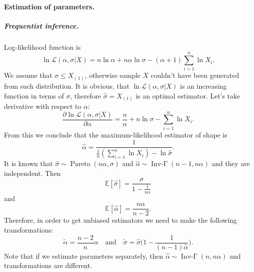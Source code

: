 \documentclass[a4paper,11pt]{article}
\theoremstyle{plain}
\theoremstyle{definition}
\begin{document}
\paragraph{Estimation of parameters.}
\subparagraph{Frequentist inference.} Log-likelihood function is
\[
\ln \mathcal{L}(\alpha, \sigma | X) = n \ln \alpha + n \alpha \ln \sigma - (\alpha + 1) \sum_{i=1}^{n} \ln X_i.
\]
We assume that $\sigma \leq X_{(1)}$, otherwise sample $X$ couldn't have been generated from such distribution. It is obvious, that $\ln \mathcal{L}(\alpha, \sigma | X)$ is an increasing function in terms of $\sigma$, therefore $\hat{\sigma} = X_{(1)}$ is an optimal estimator.
Let's take derivative with respect to $\alpha$:
\[
\frac{\partial \ln \mathcal{L}(\alpha, \sigma | X) }{\partial \alpha} = \frac{n}{\alpha} + n \ln \sigma - \sum_{i=1}^{n} \ln X_i.
\]
From this we conclude that the maximum-likelihood estimator of shape is
\[
\hat{\alpha} = \frac{1}{ \frac{1}{n} (\sum_{i=1}^{n} \ln X_i) - \ln \hat{\sigma} }.
\]
It is known that $\hat{\sigma} \sim \operatorname{Pareto}(n\alpha, \sigma)$ and $\hat{\alpha} \sim \operatorname{Inv-\Gamma}(n-1, n\alpha)$ and they are independent. Then
\[ \mathbb{E}[\hat{\sigma}] = \frac{ \sigma}{1-\frac{1}{n \alpha}}\]
and
\[ \mathbb{E}[\hat{\alpha}] = \frac{n\alpha}{n-2}. \]
Therefore, in order to get unbiased estimators we need to make the following transformations:
\[ \tilde{\alpha} = \frac{n-2}{n}\hat{\alpha} \quad \text{and} \quad \tilde{\sigma} = \hat{\sigma} \bigg(1 - \frac{1}{(n-1)\hat{\alpha}}\bigg). \]
Note that if we estimate parameters separately, then $\hat{\alpha} \sim \operatorname{Inv-\Gamma}(n, n\alpha)$ and transformations are different.
\end{document}

